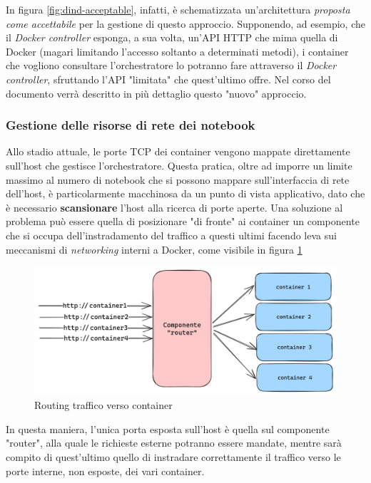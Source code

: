 \newline
In figura \ref{fig:dind-acceptable}, infatti, è schematizzata un'architettura \textit{proposta come accettabile} per la gestione di questo approccio. Supponendo, ad esempio, che il \textit{Docker controller} esponga, a sua volta, un'API HTTP che mima quella di Docker (magari limitando l'accesso soltanto a determinati metodi), i container che vogliono consultare l'orchestratore lo potranno fare attraverso il \textit{Docker controller}, sfruttando l'API "limitata" che quest'ultimo offre. Nel corso del documento verrà descritto in più dettaglio questo "nuovo" approccio.
\newpage
\subsubsection{Gestione delle risorse di rete dei notebook} \label{net-acceptable}
Allo stadio attuale, le porte TCP dei container vengono mappate direttamente sull'host che gestisce l'orchestratore. Questa pratica, oltre ad imporre un limite massimo al numero di notebook che si possono mappare sull'interfaccia di rete dell'host, è particolarmente macchinosa da un punto di vista applicativo, dato che è necessario \textbf{scansionare} l'host alla ricerca di porte aperte.
\newline
Una soluzione al problema può essere quella di posizionare "di fronte" ai container un componente che si occupa dell'instradamento del traffico a questi ultimi facendo leva sui meccanismi di \textit{networking} interni a Docker, come visibile in figura \ref{fig:routing}
\begin{figure}[h]
    \centering
    \includegraphics[width=1\textwidth]{files/images/routing-solution.png}
    \caption{Routing traffico verso container}
    \label{fig:routing}
\end{figure}
\newline
In questa maniera, l'unica porta esposta sull'host è quella sul componente "router", alla quale le richieste esterne potranno essere mandate, mentre sarà compito di quest'ultimo quello di instradare correttamente il traffico verso le porte interne, non esposte, dei vari container.
